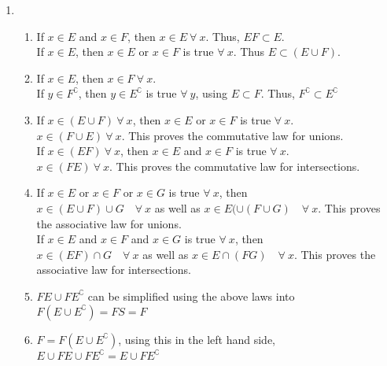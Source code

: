 \begin{enumerate}
	
	\item \begin{enumerate}
		
		\item If $ x \in E $ and $ x \in F $, then $ x \in E \ \forall\  x $. Thus, $ EF \subset E $. \\
		If $ x \in E $, then $ x \in E $ or $ x \in F $ is true $ \forall \ x $. Thus $ E \subset (E \cup F) $. \\
		
		\item If $ x \in E $, then $ x \in F \ \forall \ x$. \\
		If  $ y \in F^\complement $, then $ y \in E^\complement $ is true $ \forall \ y $, using $ E \subset F $. Thus, $ F^\complement \subset E^\complement $ \\
		
		\item If $ x \in (E \cup F) \ \forall\ x$, then $ x \in E $ or $ x \in F $ is true $ \forall \ x $.\\
		$ x \in (F \cup E) \ \forall\ x$. This proves the commutative law for unions. \\
		
		If $ x \in (E F) \ \forall\ x$, then $ x \in E $ and $ x \in F $ is true $ \forall \ x $.\\
		$ x \in (F  E) \ \forall\ x$. This proves the commutative law for intersections. \\
		
		\item If $ x \in E $ or $ x \in F $ or $ x \in G $ is true $ \forall \ x $, then \\
		$ x \in (E \cup F) \cup G \quad \forall \ x$ as well as $ x \in E(\cup (F \cup G) \quad \forall \ x$.
		This proves the associative law for unions. \\
		
		If $ x \in E $ and $ x \in F $ and $ x \in G $ is true $ \forall \ x $, then \\
		$ x \in (E F) \cap G \quad \forall \ x$ as well as $ x \in E \cap (F G) \quad \forall \ x$.
		This proves the associative law for intersections. \\
		
		\item $ FE \cup FE^\complement $ can be simplified using the above laws into \\
		$ F (E \cup E^\complement) = F S = F$ \\
		
		\item $ F = F (E \cup E^\complement) $, using this in the left hand side, \\
		$ E \cup FE \cup FE^\complement = E \cup F E^\complement$ \\
		

\end{enumerate}
\end{enumerate}
